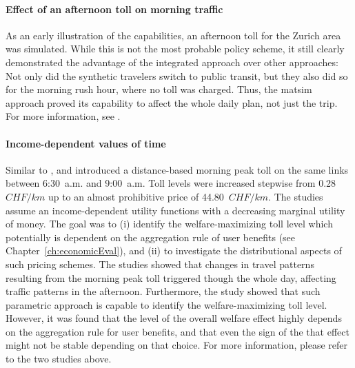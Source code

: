 \paragraph{Effect of an afternoon toll on morning traffic}

As an early illustration of the capabilities, an afternoon toll for the Zurich area was simulated.  While this is not the most probable policy scheme, it still clearly demonstrated the advantage of the integrated approach over other approaches: Not only did the synthetic travelers switch to public transit, but they also did so for the morning rush hour, where no toll was charged.  Thus, the \acrshort{matsim} approach proved its capability to affect the whole daily plan, not just the trip.  For more information, see \cite{RieserEtAl_TRBTDF_2008}.




\paragraph{Income-dependent values of time}

Similar to \cite{RieserEtAl_TRBTDF_2008}, \cite{KickhoeferEtAl2010EconomicEvaluationPublicAcceptanceRoadPricingKuhmo} and \cite{Kickhoefer_PhDThesis_2014} introduced a distance-based morning peak toll on the same links between 6:30~a.m. and 9:00~a.m. Toll levels were increased stepwise from 0.28~$CHF/km$ up to an almost prohibitive price of 44.80~$CHF/km$. The studies assume an income-dependent utility functions with a decreasing marginal utility of money. The goal was to (i) identify the welfare-maximizing toll level which potentially is dependent on the aggregation rule of user benefits (see Chapter~\ref{ch:economicEval}), and (ii) to investigate the distributional aspects of such pricing schemes.
%
The studies showed that changes in travel patterns resulting from the morning peak toll triggered though the whole day, affecting traffic patterns in the afternoon.
%
Furthermore, the study showed that such parametric approach is capable to identify the welfare-maximizing toll level. However, it was found that the level of the overall welfare effect highly depends on the aggregation rule for user benefits, and that even the sign of the that effect might not be stable depending on that choice.
%
For more information, please refer to the two studies above.

